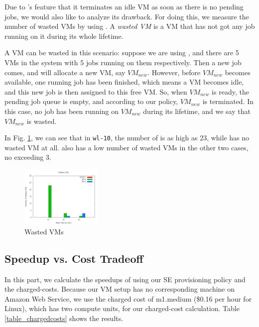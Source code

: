 Due to \SE{}'s feature that it terminates an idle VM as soon as there is
no pending jobs, we would also like to analyze its drawback.
For doing this, we measure the number of wasted VMs by using \SE{}.
A \emph{wasted VM} is a VM that has not got any job running on it during
its whole lifetime.

A VM can be wasted in this scenario: suppose we are using \SEzero{},
and there are 5 VMs in the system with 5 jobs running on them
respectively. Then a new job comes, and \SEzero{} will allocate a new VM,
say $VM_{new}$. However, before $VM_{new}$ becomes available, one
running job has been finished, which means a VM becomes idle, and this
new job is then assigned to this free VM. So, when $VM_{new}$ is
ready, the pending job queue is empty, and according to our policy,
$VM_{new}$ is terminated. In this case, no job has been running on
$VM_{new}$ during its lifetime, and we say that $VM_{new}$ is wasted.

In Fig. \ref{figure_vm_wasted}, we can see that in \texttt{wl-10},
the number of \SEzero is as high as 23, while \SEfive has no wasted VM
at all. \SEfive also has a low number of wasted VMs in the other two cases,
no exceeding 3.

\begin{figure}[!t]
\centering
\includegraphics[width=0.35\textwidth]{pictures/vm-wasted.png}
\caption{Wasted VMs}
\label{figure_vm_wasted}
\end{figure}


\subsection{Speedup vs. Cost Tradeoff}
In this part, we calculate the speedups of using our SE provisioning
policy and the charged-costs. Because our VM setup has no
corresponding machine on Amazon Web Service, we use the charged cost
of m1.medium (\$0.16 per hour for Linux), which has two compute units,
for our charged-cost calculation. Table \ref{table_chargedcosts} shows
the results.

